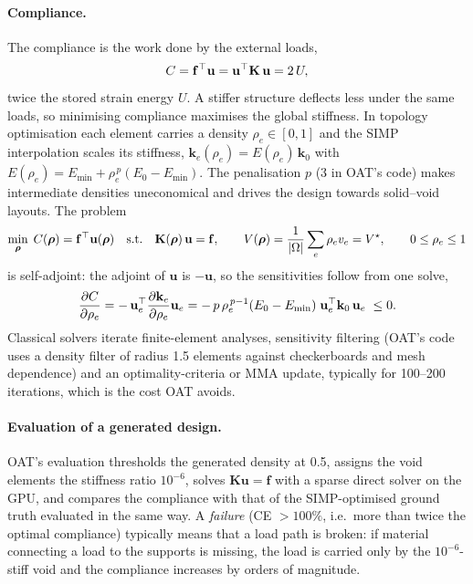 \paragraph{Compliance.} The compliance is the work done by the external loads,
\begin{equation}
  C = \mathbf f^{\top}\mathbf u = \mathbf u^{\top}\mathbf K\,\mathbf u = 2\,U ,
\end{equation}
twice the stored strain energy $U$. A stiffer structure deflects less under the same loads, so minimising compliance maximises the global stiffness. In topology optimisation each element carries a density $\rho_e\in[0,1]$ and the SIMP interpolation \citep{bendsoe1988generating,sigmund2001} scales its stiffness, $\mathbf k_e(\rho_e) = E(\rho_e)\,\mathbf k_0$ with $E(\rho_e) = E_{\min}+\rho_e^{\,p}(E_0-E_{\min})$. The penalisation $p$ (3 in OAT's code) makes intermediate densities uneconomical and drives the design towards solid--void layouts. The problem
\begin{equation}\label{eq:app-to}
  \min_{\bm\rho}\; C(\bm\rho) = \mathbf f^{\top}\mathbf u(\bm\rho)
  \quad\text{s.t.}\quad \mathbf K(\bm\rho)\,\mathbf u = \mathbf f, \qquad V(\bm\rho)=\frac{1}{|\Omega|}\sum_e \rho_e v_e = V^\star, \qquad 0\le\rho_e\le1
\end{equation}
is self-adjoint: the adjoint of $\mathbf u$ is $-\mathbf u$, so the sensitivities follow from one solve,
\begin{equation}\label{eq:app-sens}
  \frac{\partial C}{\partial\rho_e} = -\,\mathbf u_e^{\top}\frac{\partial\mathbf k_e}{\partial\rho_e}\mathbf u_e = -\,p\,\rho_e^{\,p-1}(E_0-E_{\min})\;\mathbf u_e^{\top}\mathbf k_0\,\mathbf u_e \;\le 0 .
\end{equation}
Classical solvers \citep{andreassen2011efficient} iterate finite-element analyses, sensitivity filtering (OAT's code uses a density filter of radius 1.5 elements against checkerboards and mesh dependence) and an optimality-criteria or MMA update, typically for 100--200 iterations, which is the cost OAT avoids.

\paragraph{Evaluation of a generated design.} OAT's evaluation thresholds the generated density at 0.5, assigns the void elements the stiffness ratio $10^{-6}$, solves $\mathbf K\mathbf u=\mathbf f$ with a sparse direct solver on the GPU, and compares the compliance with that of the SIMP-optimised ground truth evaluated in the same way. A \emph{failure} (CE $>100\%$, i.e.\ more than twice the optimal compliance) typically means that a load path is broken: if material connecting a load to the supports is missing, the load is carried only by the $10^{-6}$-stiff void and the compliance increases by orders of magnitude.

